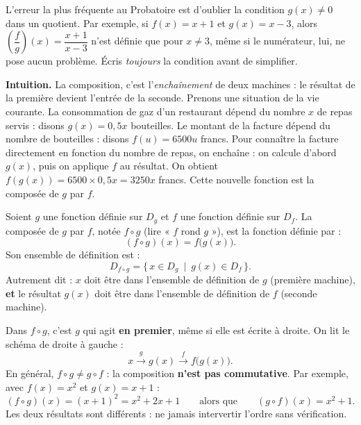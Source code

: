 \documentclass[11pt]{article}
\newcommand{\cle}[1]{{\popxbold\color{popdark}#1}}
\newcounter{popsec}
\newcounter{popsub}
\newcommand{\courssub}[1]{%
  \stepcounter{popsub}%
  \par\vspace{9pt}\noindent{\popxbold\fontsize{11.5}{13}\selectfont\color{popink}{\color{poporange}\thepopsec.\thepopsub}\hspace{6pt}#1}\par\nopagebreak\vspace{4pt}
}
\begin{document}
\begin{attention}
L'erreur la plus fréquente au Probatoire est d'oublier la condition $g(x) \neq 0$ dans un quotient. Par exemple, si $f(x) = x+1$ et $g(x) = x - 3$, alors $\left(\dfrac{f}{g}\right)(x) = \dfrac{x+1}{x-3}$ n'est définie que pour $x \neq 3$, même si le numérateur, lui, ne pose aucun problème. Écris \emph{toujours} la condition avant de simplifier.
\end{attention}

\courssub{Composition de deux fonctions}

\textbf{Intuition.} La composition, c'est l'\emph{enchaînement} de deux machines : le résultat de la première devient l'entrée de la seconde. Prenons une situation de la vie courante. La consommation de gaz d'un restaurant dépend du nombre $x$ de repas servis : disons $g(x) = 0{,}5x$ bouteilles. Le montant de la facture dépend du nombre de bouteilles : disons $f(u) = 6500u$ francs. Pour connaître la facture directement en fonction du nombre de repas, on enchaîne : on calcule d'abord $g(x)$, puis on applique $f$ au résultat. On obtient $f(g(x)) = 6500 \times 0{,}5x = 3250x$ francs. Cette nouvelle fonction est la \cle{composée} de $g$ par $f$.

\begin{definition}
Soient $g$ une fonction définie sur $D_g$ et $f$ une fonction définie sur $D_f$. La \cle{composée} de $g$ par $f$, notée $f \circ g$ (lire « $f$ rond $g$ »), est la fonction définie par :
\[ (f \circ g)(x) = f\bigl(g(x)\bigr). \]
Son ensemble de définition est :
\[ D_{f \circ g} = \{\, x \in D_g \ \mid \ g(x) \in D_f \,\}. \]
Autrement dit : $x$ doit être dans l'ensemble de définition de $g$ (première machine), \textbf{et} le résultat $g(x)$ doit être dans l'ensemble de définition de $f$ (seconde machine).
\end{definition}

\begin{attention}
Dans $f \circ g$, c'est $g$ qui agit \textbf{en premier}, même si elle est écrite à droite. On lit le schéma de droite à gauche :
\[ x \xrightarrow{\ g\ } g(x) \xrightarrow{\ f\ } f\bigl(g(x)\bigr). \]
En général, $f \circ g \neq g \circ f$ : la composition \textbf{n'est pas commutative}. Par exemple, avec $f(x) = x^2$ et $g(x) = x + 1$ :
\[ (f \circ g)(x) = (x+1)^2 = x^2 + 2x + 1 \qquad \text{alors que} \qquad (g \circ f)(x) = x^2 + 1. \]
Les deux résultats sont différents : ne jamais intervertir l'ordre sans vérification.
\end{attention}
\end{document}
